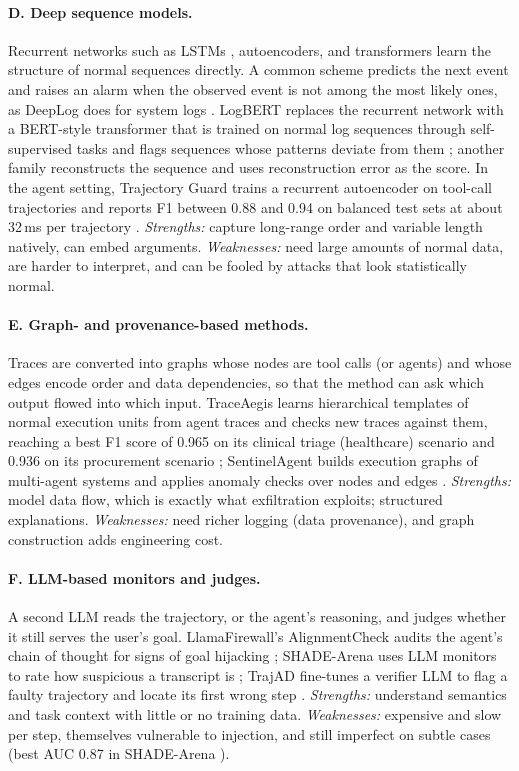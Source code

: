\documentclass[11pt,a4paper]{article}
\begin{document}
\paragraph{D. Deep sequence models.} Recurrent networks such as LSTMs \citep{hochreiter1997lstm}, autoencoders, and transformers learn the structure of normal sequences directly. A common scheme predicts the next event and raises an alarm when the observed event is not among the most likely ones, as DeepLog does for system logs \citep{du2017deeplog}. LogBERT replaces the recurrent network with a BERT-style transformer that is trained on normal log sequences through self-supervised tasks and flags sequences whose patterns deviate from them \citep{guo2021logbert}; another family reconstructs the sequence and uses reconstruction error as the score. In the agent setting, Trajectory Guard trains a recurrent autoencoder on tool-call trajectories and reports F1 between 0.88 and 0.94 on balanced test sets at about 32\,ms per trajectory \citep{advani2026trajectoryguard}. \emph{Strengths:} capture long-range order and variable length natively, can embed arguments. \emph{Weaknesses:} need large amounts of normal data, are harder to interpret, and can be fooled by attacks that look statistically normal.

\paragraph{E. Graph- and provenance-based methods.} Traces are converted into graphs whose nodes are tool calls (or agents) and whose edges encode order and data dependencies, so that the method can ask which output flowed into which input. TraceAegis learns hierarchical templates of normal execution units from agent traces and checks new traces against them, reaching a best F1 score of 0.965 on its clinical triage (healthcare) scenario and 0.936 on its procurement scenario \citep{liu2025traceaegis}; SentinelAgent builds execution graphs of multi-agent systems and applies anomaly checks over nodes and edges \citep{he2025sentinelagent}. \emph{Strengths:} model data flow, which is exactly what exfiltration exploits; structured explanations. \emph{Weaknesses:} need richer logging (data provenance), and graph construction adds engineering cost.

\paragraph{F. LLM-based monitors and judges.} A second LLM reads the trajectory, or the agent's reasoning, and judges whether it still serves the user's goal. LlamaFirewall's AlignmentCheck audits the agent's chain of thought for signs of goal hijacking \citep{chennabasappa2025llamafirewall}; SHADE-Arena uses LLM monitors to rate how suspicious a transcript is \citep{kutasov2025shade}; TrajAD fine-tunes a verifier LLM to flag a faulty trajectory and locate its first wrong step \citep{liu2026trajad}. \emph{Strengths:} understand semantics and task context with little or no training data. \emph{Weaknesses:} expensive and slow per step, themselves vulnerable to injection, and still imperfect on subtle cases (best AUC 0.87 in SHADE-Arena \citep{kutasov2025shade}).
\end{document}
